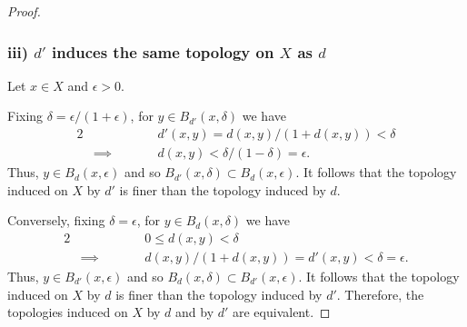 \begin{solution}
\begin{proof}
    \subsubsection*{iii) $d'$ induces the same topology on $X$ as $d$}
    Let $x \in X$ and $\epsilon > 0$.

    Fixing $\delta = \epsilon / (1 + \epsilon)$, for $y \in B_{d'}(x, \delta)$ we have
    \begin{alignat*}{2}
      &           && \qquad d'(x, y) = d(x, y) / (1 + d(x, y)) < \delta \\
      & \implies  && \qquad d(x, y) < \delta / (1 - \delta) = \epsilon.
    \end{alignat*}
    Thus, $y \in B_d(x, \epsilon)$ and so $B_{d'}(x, \delta) \subset B_d(x, \epsilon)$.
    It follows that the topology induced on $X$ by $d'$ is finer than the topology induced by $d$.

    Conversely, fixing $\delta = \epsilon$, for $y \in B_d(x, \delta)$ we have
    \begin{alignat*}{2}
      &           && \qquad 0 \leq d(x, y) < \delta \\
      & \implies  && \qquad d(x, y) / (1 + d(x, y)) = d'(x, y) < \delta = \epsilon.
    \end{alignat*}
    Thus, $y \in B_{d'}(x, \epsilon)$ and so $B_d(x, \delta) \subset B_{d'}(x, \epsilon)$.
    It follows that the topology induced on $X$ by $d$ is finer than the topology induced by $d'$.
    Therefore, the topologies induced on $X$ by $d$ and by $d'$ are equivalent.
  \end{proof}
\end{solution}
\newpage

